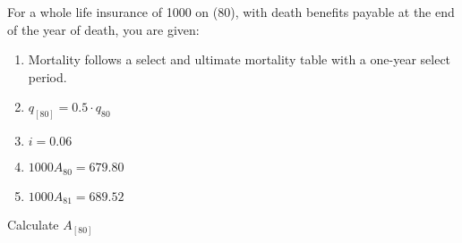 For a whole life insurance of 1000 on (80), with death benefits payable at the end of the year
of death, you are given:
\begin{enumerate}
  \item Mortality follows a select and ultimate mortality table with a one-year select period. 
  \item $q_{[80]} = 0.5\cdot q_{80}$
  \item $i=0.06$
  \item $1000A_{80}=679.80$
  \item $1000A_{81}=689.52$
\end{enumerate}
Calculate $A_{[80]}$


